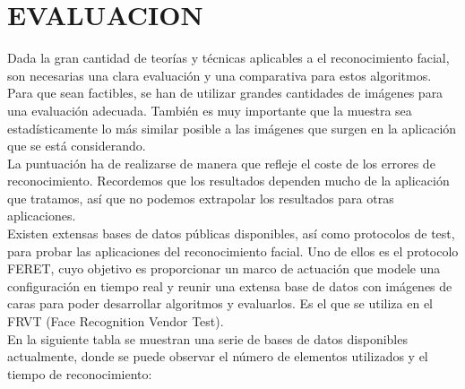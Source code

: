 \documentclass[a4paper,11pt]{article}
\begin{document}
 	
 \section{EVALUACION}
 Dada la gran cantidad de teorías y técnicas aplicables a el reconocimiento facial, son necesarias una clara evaluación y una comparativa para estos algoritmos. Para que sean factibles, se han de utilizar grandes cantidades de imágenes para una evaluación adecuada. También es muy importante que la muestra sea estadísticamente lo más similar posible a las imágenes que surgen en la aplicación que se está considerando. \\
 
 La puntuación ha de realizarse de manera que refleje el coste de los errores de reconocimiento. Recordemos que los resultados dependen mucho de la aplicación que tratamos, así que no podemos extrapolar los resultados para otras aplicaciones.\\
 
 Existen extensas bases de datos públicas disponibles, así como protocolos de test, para probar las aplicaciones del reconocimiento facial. Uno de ellos es el protocolo FERET, cuyo objetivo es proporcionar un marco de actuación que modele una configuración en tiempo real y reunir una extensa base de datos con imágenes de caras para poder desarrollar algoritmos y evaluarlos. Es el que se utiliza en el FRVT (Face Recognition Vendor Test).\\
 
 En la siguiente tabla se muestran una serie de bases de datos disponibles actualmente, donde se puede observar el número de elementos utilizados y el tiempo de reconocimiento:
 
\end{document}
